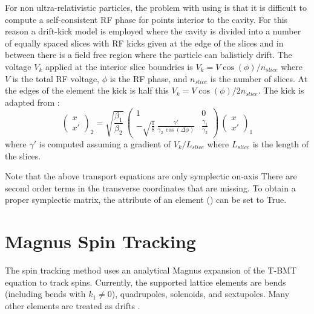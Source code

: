 For non ultra-relativistic particles, the problem with using  is that it is difficult to
compute a self-consistent RF phase for points interior to the cavity. For this reason a drift-kick
model is employed where the cavity is divided into a number of equally spaced slices with RF kicks
given at the edge of the slices and in between there is a field free region where the particle can
balisticly drift. The voltage $V_k$ applied at the interior slice boundries is $ V_k =
V\cos(\phi)/n_{slice}$ where $V$ is the total RF voltage, $\phi$ is the RF phase, and $n_{slice}$ is
the number of slices. At the edges of the element the kick is half this $V_k =
V\cos(\phi)/2n_{slice}$. The kick is adapted from :
\begin{equation}
  \begin{pmatrix}
    x \\ 
    x'
  \end{pmatrix}_2 = \sqrt{\frac{\beta_1}{\beta_2}} \, 
  \begin{pmatrix}
    1  & 0 \\
    -\sqrt{\frac{1}{8}} \, \frac{\gamma'}{\gamma_2 \, \cos(\Delta\phi)} &
        \frac{\gamma_1}{\gamma_2}
  \end{pmatrix}
  \,
  \begin{pmatrix}
    x \\ 
    x'
  \end{pmatrix}_1
  \label{xxpc2}
\end{equation}
where $\gamma'$ is computed assuming a gradient of $V_k / L_{slice}$ where $L_{slice}$ is the length of 
the slices.

Note that the above transport equations are only symplectic on-axis There are second order terms in
the transverse coordinates that are missing. To obtain a proper symplectic matrix, the
 attribute of an  element () can be set to True.

\section{Magnus Spin Tracking}
\label{s:magnus}

The  spin tracking method uses an analytical Magnus expansion of the T-BMT equation to track spins. 
Currently, the supported lattice elements are bends (including bends with $k_1 \neq 0$), quadrupoles, solenoids, and sextupoles.
Many other elements are treated as drifts .

